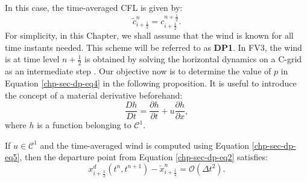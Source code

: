 In this case, the time-averaged CFL is given by:
\begin{equation}
	\label{chp-sec-dp-eq5b}
	\tilde{c}^n_{i+\frac{1}{2}} = c^{n+\frac{1}{2}}_{i+\frac{1}{2}}.
\end{equation}
For simplicity, in this Chapter, we shall assume that the wind is known for all time instants needed.
This scheme will be referred to as \textbf{DP1}.
In FV3, the wind is at time level $n+\frac{1}{2}$ is obtained by solving the horizontal dynamics on a C-grid as an intermediate step \citep{lin:1997,lin:2004}.
Our objective now is to determine the value of $p$ in Equation \eqref{chp-sec-dp-eq4}
in the following proposition. It is useful to introduce the concept of a material derivative beforehand:
\begin{equation*}
	\frac{Dh}{Dt} = \frac{\partial h}{\partial t} + u\frac{\partial h}{\partial x},
\end{equation*}
where $h$ is a function belonging to $\mathcal{C}^1$.
\begin{prop}
	\label{chp-sec-flux:dp_euler}
	If $u\in \mathcal{C}^1$ and the time-averaged wind is computed using Equation \eqref{chp-sec-dp-eq5}, then the departure point from Equation \eqref{chp-sec-dp-eq2} satisfies:
	\begin{equation}
         x_{i+\frac{1}{2}}^d(t^n,t^{n+1}) - \tilde{x}_{i+\frac{1}{2}}^n = \mathcal{O}(\Delta t^2).
	\end{equation}
\end{prop}
